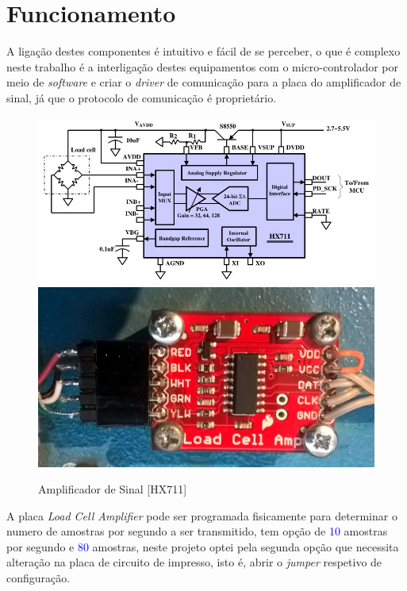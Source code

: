 \section{Funcionamento}
A ligação destes componentes é intuitivo e fácil de se perceber, o que é complexo neste trabalho é a interligação destes equipamentos com o micro-controlador por meio de \textit{software} e criar o \textit{driver} de comunicação para a placa do amplificador de sinal, já que o protocolo de comunicação é proprietário.
\begin{figure}[H]
	\captionsetup{justification=raggedright,singlelinecheck=false}
	\centering
	\includegraphics[scale=0.35]{./image/PESTA/schematic/HX711_Schematic_1.jpg}
	\includegraphics[scale=0.1]{./image/PESTA/material/HX711_board_1.jpg}
	\caption{Amplificador de Sinal [HX711]}
	\label{HX711_Schematic_1}
\end{figure}
A placa \textit{Load Cell Amplifier }pode ser programada fisicamente para determinar o numero de amostras por segundo a ser transmitido, tem opção de \textcolor{blue}{10} amostras por segundo e \textcolor{blue}{80} amostras, neste projeto optei pela segunda opção que necessita alteração na placa de circuito de impresso, isto é, abrir o \textit{jumper} respetivo de configuração.
